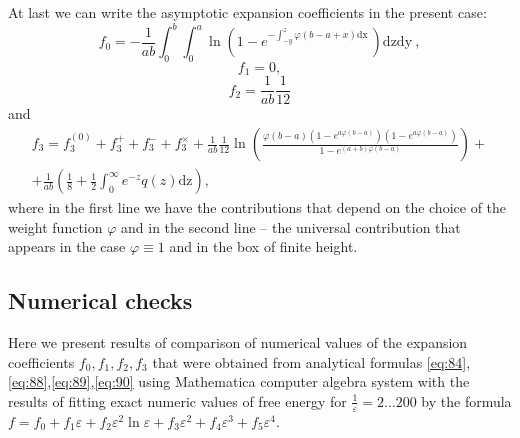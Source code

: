 \documentclass{article}
\newcommand{\dx}{\mathrm{dx}~}
\newcommand{\dy}{\mathrm{dy}~}
\newcommand{\dz}{\mathrm{dz}}
\begin{document}
At last we can write the asymptotic expansion coefficients in the present case:
\begin{equation}
  \label{eq:84}
  f_{0}= -\frac{1}{ab}\int_{0}^{b}\int_{0}^{a}\ln
  \left(1-e^{-\int_{-y}^{z}\varphi\left(b-a+x\right)\dx} \right)\dz\dy,
\end{equation}
\begin{equation}
  \label{eq:88}
  f_{1}=0,
\end{equation}
\begin{equation}
  \label{eq:89}
  f_{2}=\frac{1}{ab}\frac{1}{12}
\end{equation}
and
\begin{multline}
  \label{eq:90}
  f_{3}=f^{(0)}_{3}+f^{+}_{3}+f^{-}_{3}+f^{\times}_{3}+
  \frac{1}{ab}\frac{1}{12}\ln\left(\frac{\varphi(b-a)\left(1-e^{a\varphi(b-a)}\right)\left(1-e^{a\varphi(b-a)}\right)}{1-e^{(a+b)\varphi(b-a)}}\right)+\\
  +\frac{1}{ab}\left(\frac{1}{8} +\frac{1}{2} \int_{0}^{\infty}
    e^{-z}q(z) \dz\right),
\end{multline}
where in the first line we have the contributions that depend on the choice of the weight function
$\varphi$ and in the second line -- the universal contribution that appears in the case
$\varphi\equiv 1$ and in the box of finite height.

\subsection{Numerical checks}
\label{sec:numerical-checks-nonuniform}
Here we present results of comparison of numerical values of the expansion coefficients
$f_{0},f_{1},f_{2},f_{3}$ that were obtained from analytical formulas
\eqref{eq:84},\eqref{eq:88},\eqref{eq:89},\eqref{eq:90} using Mathematica computer algebra system
with the results of fitting exact numeric values of free energy for $\frac{1}{\varepsilon}=2\dots
200$
by the formula $f=f_{0}+
f_{1}\varepsilon+
f_{2}\varepsilon^{2}\ln\varepsilon+f_{3}\varepsilon^{2}+f_{4}\varepsilon^{3}+f_{5}\varepsilon^{4}$. 
\end{document}
